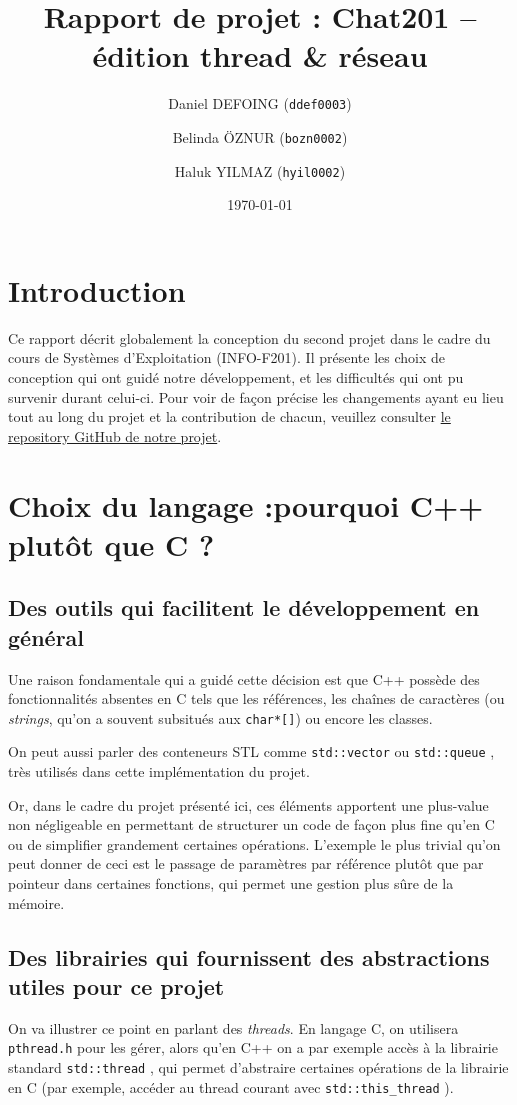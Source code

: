 \documentclass{article}
\title{Rapport de projet : Chat201 – édition thread \& réseau}
\author{Daniel DEFOING (\texttt{ddef0003}) \and 
        Belinda ÖZNUR (\texttt{bozn0002}) \and
        Haluk YILMAZ (\texttt{hyil0002})}
\date{\today}
\begin{document}

\maketitle
\tableofcontents
\newpage

\section{Introduction}
\noindent Ce rapport décrit globalement la conception du second projet dans le cadre du cours de Systèmes d'Exploitation
(INFO-F201). Il présente les choix de conception qui ont guidé notre développement, et les difficultés qui ont pu survenir durant celui-ci. Pour voir de façon précise les changements ayant eu lieu tout au long du projet et la contribution de chacun, veuillez consulter \hyperref[https://github.com/Daniel-Dfg/OS_Projet_2]{le repository GitHub de notre projet}.

\section{Choix du langage :pourquoi C++ plutôt que C ?}

\subsection*{Des outils qui facilitent le développement en général}
\noindent Une raison fondamentale qui a guidé cette décision est que C++ possède des fonctionnalités absentes en C tels que les références, les chaînes de caractères (ou \textit{strings}, qu'on a souvent subsitués aux \texttt{char*[]}) ou encore les classes.

\noindent On peut aussi parler des conteneurs STL comme \texttt{std::vector} ou \texttt{std::queue} \cite{std::queue}, très utilisés dans cette implémentation du projet.


\noindent Or, dans le cadre du projet présenté ici, ces éléments apportent une plus-value non négligeable en permettant de structurer un code de façon plus fine qu'en C ou de simplifier grandement certaines opérations. L'exemple le plus trivial qu'on peut donner de ceci est le passage de paramètres par référence plutôt que par pointeur dans certaines fonctions, qui permet une gestion plus sûre de la mémoire.

\subsection*{Des librairies qui fournissent des abstractions utiles pour ce projet}
\noindent On va illustrer ce point en parlant des \textit{threads}. En langage C, on utilisera \texttt{pthread.h} \cite{pthread.h} pour les gérer, alors qu'en C++ on a par exemple accès à la librairie standard \texttt{std::thread} \cite{std::thread}, qui permet d'abstraire certaines opérations de la librairie en C (par exemple, accéder au thread courant avec \texttt{std::this\_thread} \cite{std::thread}).
\end{document}
